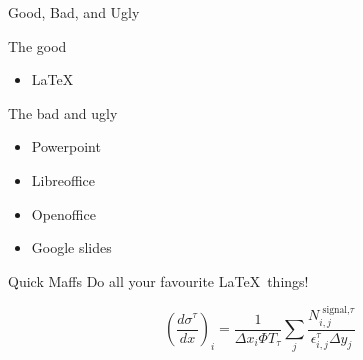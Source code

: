 \documentclass[14pt,aspectratio=169]{beamer} %
\begin{document}
\begin{frame}{Good, Bad, and Ugly}
  \begin{minipage}[t]{0.49\textwidth} %
    The good
    \begin{itemize}
        \item LaTeX
    \end{itemize}
  \end{minipage}%
  \begin{minipage}[t]{0.49\textwidth} %
    The bad and ugly
    \begin{itemize}
      \item Powerpoint
      \item Libreoffice
      \item Openoffice
      \item Google slides
    \end{itemize}
  \end{minipage}
\end{frame}


\begin{frame}{Quick Maffs}
  Do all your favourite \LaTeX \ things!

  \begin{equation}
    \left(\frac{d \sigma^\tau}{dx}\right)_i = \frac{1}{\Delta x_i \Phi T_\tau} \sum_j \frac{N_{i,j}^{\text{ signal,}\tau}}{\epsilon_{i,j}^\tau \Delta y_j}
  \end{equation}
\end{frame}
\end{document}
